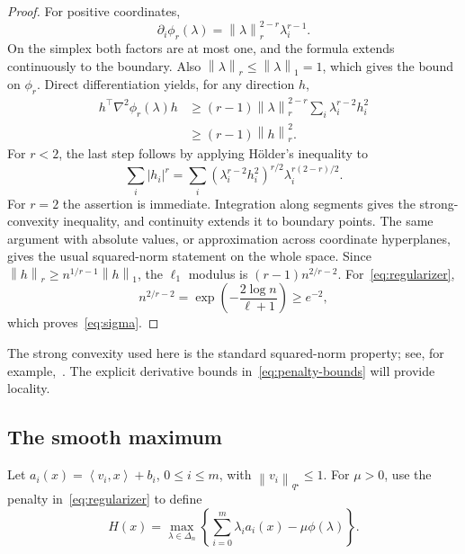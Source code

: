 \documentclass[11pt,a4paper]{article}
\theoremstyle{definition}
\theoremstyle{remark}
\newcommand{\norm}[1]{\left\lVert #1\right\rVert}
\newcommand{\ip}[2]{\left\langle #1,#2\right\rangle}
\begin{document}
\begin{proof}
For positive coordinates,
\[
  \partial_i\phi_r(\lambda)
     =\norm{\lambda}_r^{2-r}\lambda_i^{r-1}.
\]
On the simplex both factors are at most one, and the formula extends
continuously to the boundary. Also $\norm{\lambda}_r\le\norm{\lambda}_1=1$,
which gives the bound on $\phi_r$.
Direct differentiation yields, for any direction $h$,
\begin{align*}
 h^\top\nabla^2\phi_r(\lambda)h
 &\ge(r-1)\norm{\lambda}_r^{2-r}
                  \sum_i\lambda_i^{r-2}h_i^2\\
 &\ge(r-1)\norm{h}_r^2.
\end{align*}
For $r<2$, the last step follows by applying H\"older's inequality to
\[
  \sum_i|h_i|^r
  =\sum_i(\lambda_i^{r-2}h_i^2)^{r/2}
              \lambda_i^{r(2-r)/2}.
\]
For $r=2$ the assertion is immediate. Integration along segments gives the
strong-convexity inequality, and continuity extends it to boundary points.
The same argument with absolute values, or approximation across coordinate
hyperplanes, gives the usual squared-norm statement on the whole space.
Since $\norm{h}_r\ge n^{1/r-1}\norm{h}_1$, the $\ell_1$ modulus is
$(r-1)n^{2/r-2}$. For~\eqref{eq:regularizer},
\[
 n^{2/r-2}
 =\exp\!\left(-\frac{2\log n}{\ell+1}\right)\ge e^{-2},
\]
which proves~\eqref{eq:sigma}.
\end{proof}

The strong convexity used here is the standard squared-norm property;
see, for example,~\cite[Section 7.2]{DSSST10}. The explicit derivative bounds
in~\eqref{eq:penalty-bounds} will provide locality.

\subsection{The smooth maximum}

Let $a_i(x)=\ip{v_i}{x}+b_i$, $0\le i\le m$, with
$\norm{v_i}_{q^\star}\le1$. For $\mu>0$, use the penalty
in~\eqref{eq:regularizer} to define
\begin{equation}\label{eq:smoothmax}
 H(x)=\max_{\lambda\in\Delta_n}
       \left\{\sum_{i=0}^m\lambda_i a_i(x)-\mu\phi(\lambda)\right\}.
\end{equation}
\end{document}
